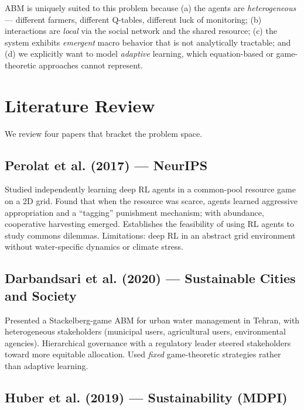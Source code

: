 \documentclass[12pt, a4paper]{article}
\begin{document}
ABM is uniquely suited to this problem because (a) the agents are
\emph{heterogeneous} --- different farmers, different Q-tables, different luck
of monitoring; (b) interactions are \emph{local} via the social network and the
shared resource; (c) the system exhibits \emph{emergent} macro behavior that is
not analytically tractable; and (d) we explicitly want to model \emph{adaptive}
learning, which equation-based or game-theoretic approaches cannot represent.

\section{Literature Review}

We review four papers that bracket the problem space.

\subsection{Perolat et al. (2017) --- NeurIPS}

Studied independently learning deep RL agents in a common-pool resource game on
a 2D grid. Found that when the resource was scarce, agents learned aggressive
appropriation and a ``tagging'' punishment mechanism; with abundance, cooperative
harvesting emerged. Establishes the feasibility of using RL agents to study
commons dilemmas. Limitations: deep RL in an abstract grid environment without
water-specific dynamics or climate stress.

\subsection{Darbandsari et al. (2020) --- Sustainable Cities and Society}

Presented a Stackelberg-game ABM for urban water management in Tehran, with
heterogeneous stakeholders (municipal users, agricultural users, environmental
agencies). Hierarchical governance with a regulatory leader steered stakeholders
toward more equitable allocation. Used \emph{fixed} game-theoretic strategies
rather than adaptive learning.

\subsection{Huber et al. (2019) --- Sustainability (MDPI)}
\end{document}
